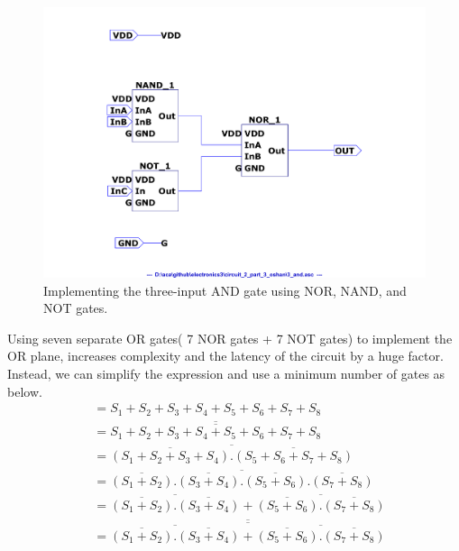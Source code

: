 \documentclass[a4paper,11pt]{article}%
\begin{document}
\begin{figure}[H]
	\centering
	\includegraphics[scale=0.6]{figures/Figure332.pdf}
	\caption{Implementing the three-input AND gate using NOR, NAND, and NOT gates.}
\end{figure}

Using seven separate OR gates( 7 NOR gates + 7 NOT gates) to implement the OR plane, increases complexity and the latency of the circuit by a huge factor. Instead, we can simplify the expression and use a minimum number of gates as below.\\

\[
\begin{split}
 & = S_1 + S_2 + S_3 + S_4 + S_5 + S_6 + S_7 + S_8\\
 & = \overline{\overline{S_1 + S_2 + S_3 + S_4 + S_5 + S_6 + S_7 + S_8}}\\
 & = \overline{\overline{\left( S_1 + S_2 + S_3 + S_4 \right)}. \overline{\left( S_5 + S_6 + S_7 + S_8 \right)}}\\
  & = \overline{\overline{\left( S_1 + S_2\right)} .\overline{\left( S_3 + S_4 \right)}. \overline{\left( S_5 + S_6\right)}.  \overline{\left( S_7 + S_8 \right)}}\\
    & = \overline{\overline{\left( S_1 + S_2\right)} .\overline{\left( S_3 + S_4 \right)}}+ \overline{\overline{\left( S_5 + S_6\right)}.  \overline{\left( S_7 + S_8 \right)}}\\
    & = \overline{\overline{ \overline{\overline{\left( S_1 + S_2\right)} .\overline{\left( S_3 + S_4 \right)}}+ \overline{\overline{\left( S_5 + S_6\right)}.  \overline{\left( S_7 + S_8 \right)}} }}
\end{split}
\]
\end{document}
